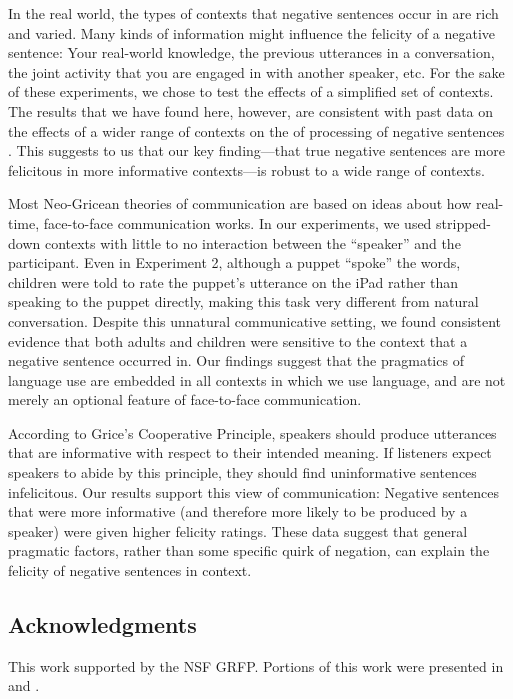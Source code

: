 \documentclass[man, noapacite]{apa2}
\begin{document}
In the real world, the types of contexts that negative sentences occur in are rich and varied. Many kinds of information might influence the felicity of a negative sentence: Your real-world knowledge, the previous utterances in a conversation, the joint activity that you are engaged in with another speaker, etc. For the sake of these experiments, we chose to test the effects of a simplified set of contexts. The results that we have found here, however, are consistent with past data on the effects of a wider range of contexts on the of processing of negative sentences \cite{wason1965, glenberg1999, nieuwland2008, dale2011, nordmeyer2014}. This suggests to us that our key finding---that true negative sentences are more felicitous in more informative contexts---is robust to a wide range of contexts.

Most Neo-Gricean theories of communication are based on ideas about how real-time, face-to-face communication works. In our experiments, we used stripped-down contexts with little to no interaction between the ``speaker'' and the participant. Even in Experiment 2, although a puppet ``spoke'' the words, children were told to rate the puppet's utterance on the iPad rather than speaking to the puppet directly, making this task very different from natural conversation. Despite this unnatural communicative setting, we found consistent evidence that both adults and children were sensitive to the context that a negative sentence occurred in. Our findings suggest that the pragmatics of language use are embedded in all contexts in which we use language, and are not merely an optional feature of face-to-face communication.

According to Grice's Cooperative Principle, speakers should produce utterances that are informative with respect to their intended meaning. If listeners expect speakers to abide by this principle, they should find uninformative sentences infelicitous. Our results support this view of communication: Negative sentences that were more informative (and therefore more likely to be produced by a speaker) were given higher felicity ratings. These data suggest that general pragmatic factors, rather than some specific quirk of negation, can explain the felicity of negative sentences in context.

\subsection{Acknowledgments}
This work supported by the NSF GRFP. Portions of this work were presented in  and .



\setlength{\bibleftmargin}{.125in}
\setlength{\bibindent}{-\bibleftmargin}


\end{document}

